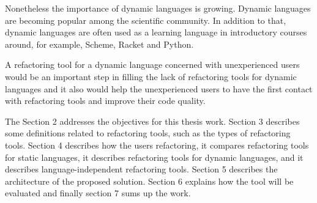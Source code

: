 Nonetheless the importance of dynamic languages is growing. Dynamic languages are becoming popular among the scientific community.
In addition to that, dynamic languages are often used as a learning language in introductory courses around, for example, Scheme, Racket and Python.

A refactoring tool for a dynamic language concerned with unexperienced users would be an important step in filling the lack of refactoring tools for dynamic languages and it also would help the unexperienced users to have the first contact with refactoring tools and improve their code quality.



The Section 2 addresses the objectives for this thesis work. 
Section 3 describes some definitions related to refactoring tools, such as the types of refactoring tools.
Section 4 describes how the users refactoring, it compares refactoring tools for static languages, it describes refactoring tools for dynamic languages, and it describes language-independent refactoring tools.
Section 5 describes the architecture of the proposed solution. 
Section 6 explains how the tool will be evaluated and finally section 7 sums up the work.












